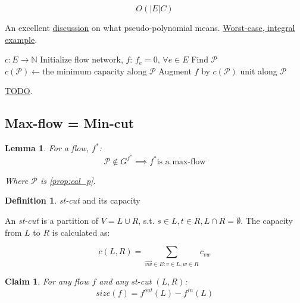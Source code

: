 \documentclass{article}
\newtheorem{claim}[theorem]{Claim}
\newtheorem{lemma}[theorem]{Lemma}
\theoremstyle{definition}
\newtheorem{definition}{Definition}[section]
\begin{document}
$$O(|E|C)$$

An excellent \href{https://stackoverflow.com/questions/19649026/is-network-flow-pseudo-polynomial-time}{discussion} on what pseudo-polynomial means. \href{https://en.wikipedia.org/wiki/Ford%E2%80%93Fulkerson_algorithm#Integral_example}{Worst-case, integral example}.
	
\begin{algorithm}
	\caption{$EdmonsKarp$}
	\label{alg:edmons_karp}
	\begin{algorithmic}[1]
		\REQUIRE $c : E \to \mathbb{N}$ 
		\STATE Initialize flow network, $f$: $f_e = 0, \, \forall e \in E$
		\STATE Find $\mathcal{P}$
		\STATE $c(\mathcal{P}) \gets \text{the minimum capacity along } \mathcal{P}$
		\STATE Augment $f$ by $c(\mathcal{P})$ unit along $\mathcal{P}$
		\ENDWHILE
	\end{algorithmic}
	\href{https://classroom.udacity.com/courses/ud401/lessons/8e8db62c-39bd-4dc2-bbe7-b9774e41756f/concepts/77dcde9a-43f0-4eea-889b-14b1ec034a28}{TODO}.
\end{algorithm}

\subsection{Max-flow = Min-cut}
\begin{lemma}
\label{lem:aug_path}
For a flow, $f^*$: $$\mathcal{P} \notin G^{f^*} \implies f^* \text{is a max-flow}$$
	
Where $\mathcal{P}$ is \ref{prop:cal_p}.
\end{lemma}

\begin{definition}{\textit{st-cut} and its capacity}
\label{def:st_cut_cap}

An \textit{st-cut} is a partition of $V = L \cup R$, s.t. $s \in L, t \in R, L \cap R = \emptyset$. The capacity from $L$ to $R$ is calculated as:

$$c(L,R) = \sum_{\overrightarrow{vw} \in E : v \in L, w \in R} c_{vw}$$
\end{definition}

\begin{claim}
\label{clm:in_out_flow}
For any flow $f$ and any st-cut $(L,R)$:
$$size(f) = f^{out} (L) - f^{in} (L)$$
\end{claim}
\end{document}
